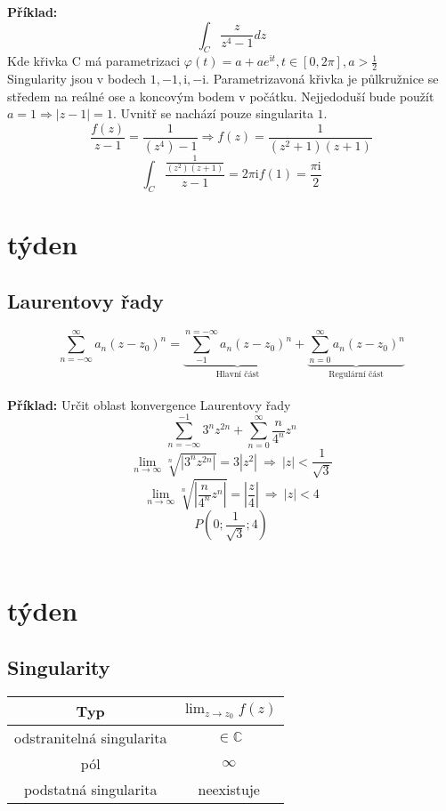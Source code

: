 \documentclass{article}
\newcommand{\mi}{\mathrm{i}}
\begin{document}
        {\bf Příklad:}
        \[\int_C\frac{z}{z^4-1}dz\]
        Kde křivka C má parametrizaci $\varphi(t)=a+ae^{\mi t}, t\in[0,2\pi], a>\frac{1}{2}$
        \\
        Singularity jsou v bodech $1,-1,\mi,-\mi$.
        Parametrizavoná křivka je půlkružnice se středem na reálné ose a koncovým
        bodem v počátku. Nejjedoduší bude použít $a=1\Rightarrow |z-1|=1$.
        Uvnitř se nachází pouze singularita $1$.
        \[\frac{f(z)}{z-1}=\frac{1}{(z^4)-1}\Rightarrow f(z)=\frac{1}{(z^2+1)(z+1)}\]
        \[\int_C\frac{\frac{1}{(z^2)(z+1)}}{z-1}=2\pi\mi f(1)=\frac{\pi\mi}{2}\]
    \section{týden}%
        \subsection{Laurentovy řady}
        \[\sum_{n=-\infty}^{\infty}a_n(z-z_0)^n=
        \underbrace{\sum_{-1}^{n=-\infty}a_n(z-z_0)^n}_{\mbox{Hlavní část}}+
        \underbrace{\sum_{n=0}^{\infty}a_n(z-z_0)^n}_{\mbox{Regulární část}}\]
        \\
        {\bf Příklad:}
        Určit oblast konvergence Laurentovy řady
        \[\sum_{n=-\infty}^{-1}3^nz^{2n}+\sum_{n=0}^{\infty}\frac{n}{4^n}z^n\]
        \[\lim_{n\to\infty}\sqrt[n]{\left|3^nz^{2n}\right|}=3|z^2|\:\Rightarrow\:
        |z|<\frac{1}{\sqrt{3}}\]
        \[\lim_{n\to\infty}\sqrt[n]{\left|\frac{n}{4^n}z^n\right|}=
        \left|\frac{z}{4}\right|\:\Rightarrow\:|z|<4\]
        \[P\left(0;\frac{1}{\sqrt{3}};4\right)\]
        \\
        

    \section{týden}%
        \subsection{Singularity}
            \begin{center}            
                \begin{tabular}{|cc|}
                    \hline
                    Typ&$\lim_{z\to z_0}f(z)$\\
                    \hline
                    odstranitelná singularita& $\in \mathbb{C}$\\
                    pól&$\infty$\\
                    podstatná singularita &neexistuje\\
                    \hline
                \end{tabular}
            \end{center}
            
\end{document}
